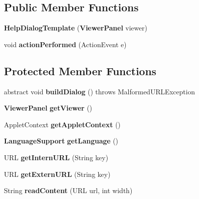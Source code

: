 \subsection*{Public Member Functions}
\begin{DoxyCompactItemize}
\item 
{\bfseries Help\-Dialog\-Template} ({\bf Viewer\-Panel} viewer)\label{classdesmoj_1_1extensions_1_1visualization2d_1_1engine_1_1viewer_1_1_help_dialog_template_a33a6819518210a5c037694bf2854678f}

\item 
void {\bfseries action\-Performed} (Action\-Event e)\label{classdesmoj_1_1extensions_1_1visualization2d_1_1engine_1_1viewer_1_1_help_dialog_template_aed4c15022b3ee6280aa1062c952bc94d}

\end{DoxyCompactItemize}
\subsection*{Protected Member Functions}
\begin{DoxyCompactItemize}
\item 
abstract void {\bfseries build\-Dialog} ()  throws Malformed\-U\-R\-L\-Exception\label{classdesmoj_1_1extensions_1_1visualization2d_1_1engine_1_1viewer_1_1_help_dialog_template_a0907ddf4f3f4587987f233b5619dba87}

\item 
{\bf Viewer\-Panel} {\bfseries get\-Viewer} ()\label{classdesmoj_1_1extensions_1_1visualization2d_1_1engine_1_1viewer_1_1_help_dialog_template_a7423fc5ec8d41ec0363d7d2dde7c4b25}

\item 
Applet\-Context {\bfseries get\-Applet\-Context} ()\label{classdesmoj_1_1extensions_1_1visualization2d_1_1engine_1_1viewer_1_1_help_dialog_template_ab02429a35f881851714cd3d03ca074c9}

\item 
{\bf Language\-Support} {\bfseries get\-Language} ()\label{classdesmoj_1_1extensions_1_1visualization2d_1_1engine_1_1viewer_1_1_help_dialog_template_af407eb2ca9fceb8e22ca2f35ce6c5a55}

\item 
U\-R\-L {\bfseries get\-Intern\-U\-R\-L} (String key)\label{classdesmoj_1_1extensions_1_1visualization2d_1_1engine_1_1viewer_1_1_help_dialog_template_a9fbe27b59c76f484cc23886e0d869492}

\item 
U\-R\-L {\bfseries get\-Extern\-U\-R\-L} (String key)\label{classdesmoj_1_1extensions_1_1visualization2d_1_1engine_1_1viewer_1_1_help_dialog_template_aa3e3d0f89f619718237ffa678b7200c1}

\item 
String {\bfseries read\-Content} (U\-R\-L url, int width)\label{classdesmoj_1_1extensions_1_1visualization2d_1_1engine_1_1viewer_1_1_help_dialog_template_a38d991d4d541c4a6fbf469e1a1d2b082}

\end{DoxyCompactItemize}


